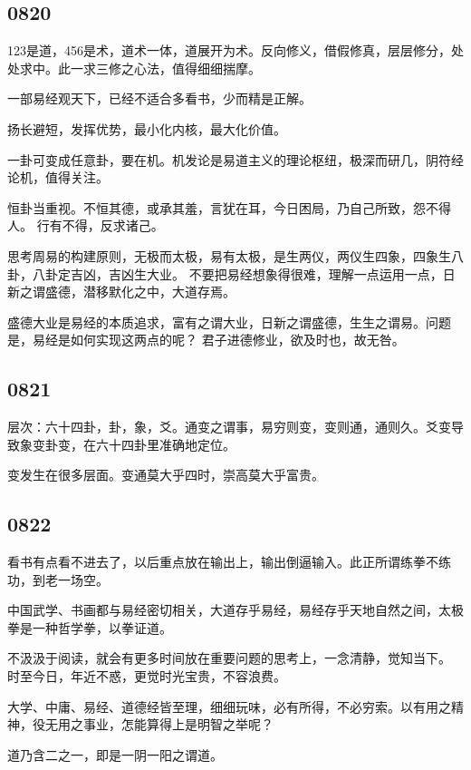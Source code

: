 \subsection{0820}

123是道，456是术，道术一体，道展开为术。反向修义，借假修真，层层修分，处处求中。此一求三修之心法，值得细细揣摩。

一部易经观天下，已经不适合多看书，少而精是正解。

扬长避短，发挥优势，最小化内核，最大化价值。

一卦可变成任意卦，要在机。机发论是易道主义的理论枢纽，极深而研几，阴符经论机，值得关注。

恒卦当重视。不恒其德，或承其羞，言犹在耳，今日困局，乃自己所致，怨不得人。
行有不得，反求诸己。

思考周易的构建原则，无极而太极，易有太极，是生两仪，两仪生四象，四象生八卦，八卦定吉凶，吉凶生大业。
不要把易经想象得很难，理解一点运用一点，日新之谓盛德，潜移默化之中，大道存焉。

盛德大业是易经的本质追求，富有之谓大业，日新之谓盛德，生生之谓易。问题是，易经是如何实现这两点的呢？
君子进德修业，欲及时也，故无咎。

\subsection{0821}

层次：六十四卦，卦，象，爻。通变之谓事，易穷则变，变则通，通则久。爻变导致象变卦变，在六十四卦里准确地定位。

变发生在很多层面。变通莫大乎四时，崇高莫大乎富贵。

\subsection{0822}

看书有点看不进去了，以后重点放在输出上，输出倒逼输入。此正所谓练拳不练功，到老一场空。

中国武学、书画都与易经密切相关，大道存乎易经，易经存乎天地自然之间，太极拳是一种哲学拳，以拳证道。

不汲汲于阅读，就会有更多时间放在重要问题的思考上，一念清静，觉知当下。
时至今日，年近不惑，更觉时光宝贵，不容浪费。

大学、中庸、易经、道德经皆至理，细细玩味，必有所得，不必穷索。以有用之精神，役无用之事业，怎能算得上是明智之举呢？

道乃含二之一，即是一阴一阳之谓道。
